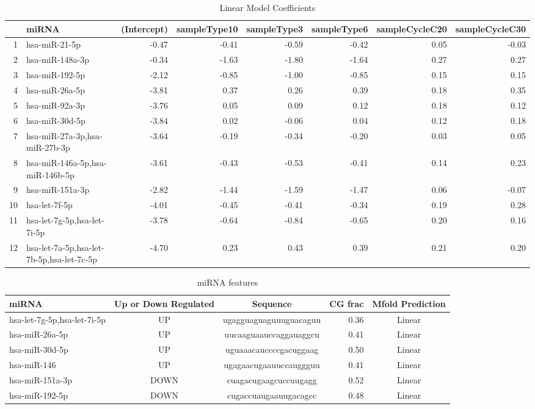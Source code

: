 \documentclass{bioinfo}
\begin{document}
\begin{table}[ht]
\caption {Linear Model Coefficients} \label{tab:1}
\centering
\begin{tabular}{rlrrrrrr}
  \hline
 & miRNA & (Intercept) & sampleType10 & sampleType3 & sampleType6 & sampleCycleC20 & sampleCycleC30 \\ 
  \hline
1 & hsa-miR-21-5p & -0.47 & -0.41 & -0.59 & -0.42 & 0.05 & -0.03 \\ 
  2 & hsa-miR-148a-3p & -0.34 & -1.63 & -1.80 & -1.64 & 0.27 & 0.27 \\ 
  3 & hsa-miR-192-5p & -2.12 & -0.85 & -1.00 & -0.85 & 0.15 & 0.15 \\ 
  4 & hsa-miR-26a-5p & -3.81 & 0.37 & 0.26 & 0.39 & 0.18 & 0.35 \\ 
  5 & hsa-miR-92a-3p & -3.76 & 0.05 & 0.09 & 0.12 & 0.18 & 0.12 \\ 
  6 & hsa-miR-30d-5p & -3.84 & 0.02 & -0.06 & 0.04 & 0.12 & 0.18 \\ 
  7 & hsa-miR-27a-3p,hsa-miR-27b-3p & -3.64 & -0.19 & -0.34 & -0.20 & 0.03 & 0.05 \\ 
  8 & hsa-miR-146a-5p,hsa-miR-146b-5p & -3.61 & -0.43 & -0.53 & -0.41 & 0.14 & 0.23 \\ 
  9 & hsa-miR-151a-3p & -2.82 & -1.44 & -1.59 & -1.47 & 0.06 & -0.07 \\ 
  10 & hsa-let-7f-5p & -4.01 & -0.45 & -0.41 & -0.34 & 0.19 & 0.28 \\ 
  11 & hsa-let-7g-5p,hsa-let-7i-5p & -3.78 & -0.64 & -0.84 & -0.65 & 0.20 & 0.16 \\ 
  12 & hsa-let-7a-5p,hsa-let-7b-5p,hsa-let-7c-5p & -4.70 & 0.23 & 0.43 & 0.39 & 0.21 & 0.20 \\ 
   \hline
\end{tabular}
\end{table}

\begin{table}[ht]
\caption {miRNA features} \label{tab:2}
\centering
\begin{tabular}{lccrc}
  \hline
 miRNA &  Up or Down Regulated & Sequence & CG frac & Mfold Prediction  \\ 
  \hline
  hsa-let-7g-5p,hsa-let-7i-5p & UP & ugagguaguaguuuguacaguu & 0.36 & Linear \\
  hsa-miR-26a-5p   & UP & uucaaguaauccaggauaggcu & 0.41 & Linear \\
  hsa-miR-30d-5p   & UP & uguaaacauccccgacuggaag & 0.50  & Linear\\
  hsa-miR-146        & UP &  ugagaacugaauuccauggguu & 0.41  & Linear\\
  hsa-miR-151a-3p & DOWN & cuagacugaagcuccuugagg & 0.52  & Linear\\
  hsa-miR-192-5p & DOWN & cugaccuaugaauugacagcc & 0.48  & Linear\\
 \hline
\end{tabular}
\end{table}
\end{document}
